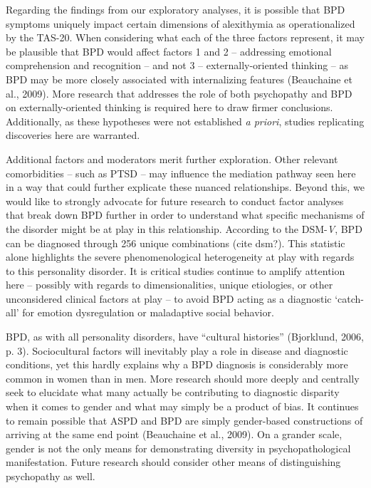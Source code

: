\documentclass[
  man,floatsintext]{apa7}
\begin{document}
Regarding the findings from our exploratory analyses, it is possible that BPD symptoms uniquely impact certain dimensions of alexithymia as operationalized by the TAS-20. When considering what each of the three factors represent, it may be plausible that BPD would affect factors 1 and 2 -- addressing emotional comprehension and recognition -- and not 3 -- externally-oriented thinking -- as BPD may be more closely associated with internalizing features (Beauchaine et al., 2009). More research that addresses the role of both psychopathy and BPD on externally-oriented thinking is required here to draw firmer conclusions. Additionally, as these hypotheses were not established \emph{a priori}, studies replicating discoveries here are warranted.

Additional factors and moderators merit further exploration. Other relevant comorbidities -- such as PTSD -- may influence the mediation pathway seen here in a way that could further explicate these nuanced relationships. Beyond this, we would like to strongly advocate for future research to conduct factor analyses that break down BPD further in order to understand what specific mechanisms of the disorder might be at play in this relationship. According to the DSM-\emph{V}, BPD can be diagnosed through 256 unique combinations (cite dsm?). This statistic alone highlights the severe phenomenological heterogeneity at play with regards to this personality disorder. It is critical studies continue to amplify attention here -- possibly with regards to dimensionalities, unique etiologies, or other unconsidered clinical factors at play -- to avoid BPD acting as a diagnostic `catch-all' for emotion dysregulation or maladaptive social behavior.

BPD, as with all personality disorders, have ``cultural histories'' (Bjorklund, 2006, p. 3). Sociocultural factors will inevitably play a role in disease and diagnostic conditions, yet this hardly explains why a BPD diagnosis is considerably more common in women than in men. More research should more deeply and centrally seek to elucidate what many actually be contributing to diagnostic disparity when it comes to gender and what may simply be a product of bias. It continues to remain possible that ASPD and BPD are simply gender-based constructions of arriving at the same end point (Beauchaine et al., 2009). On a grander scale, gender is not the only means for demonstrating diversity in psychopathological manifestation. Future research should consider other means of distinguishing psychopathy as well.
\end{document}
